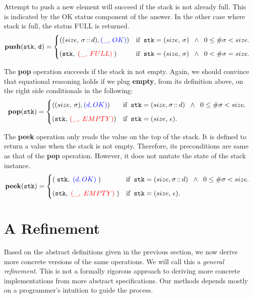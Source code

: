 \documentclass[10pt]{article}
\begin{document}
    Attempt to push a new element will succeed if the stack is not already full. This is indicated by the OK status component of the answer. In the other case where stack is full, the status FULL is returned.
    \[
        \mathtt{\mathbf{push}(stk,\, d)} = \begin{cases} ((size, \,\sigma \,\mathbf{::}\, d),  {\textcolor{blue}{(\_, \,OK)}}) & \mbox{if\;\;} \mathtt{stk} = (size, \,\sigma) \;\; \wedge \;\; 0 \leq \#\sigma < size. \vspace*{6pt}\\ 
        (\mathtt{stk},\;{\textcolor{red}{(\_, \,FULL)}} \; ) & \mbox{if\;\;} \mathtt{stk} = (size, \,\sigma) \;\; \wedge \;\; 0 < \#\sigma = size. \end{cases} 
    \]

    The \textbf{pop} operation succeeds if the stack in not empty. Again, we should convince that equational reasoning holds if we plug \textbf{empty}, from its definition above, on the right side conditionals in the following:
    \[
        \mathtt{\mathbf{pop}(stk)} = \begin{cases} ((size, \, \sigma), {\textcolor{blue}{(d, OK)}}) & \mbox{if\;\;} \mathtt{stk} = (size, \sigma \,\mathbf{::} \,d) \;\; \wedge \;\; 0 
        \leq \#\sigma < size. \vspace*{6pt}\\ 
        (\mathtt{stk},\,{\textcolor{red}{(\_,\; EMPTY)}})  & \mbox{if\;\;}\mathtt{stk} = (size, \, \epsilon). \end{cases} 
    \]

    The \textbf{peek} operation only reads the value on the top of the stack. It is defined to return a value when the stack is not empty. Therefore, its preconditions are same as that of the \textbf{pop} operation. However, it does not mutate the state of the stack instance.
    \[
        \mathtt{\mathbf{peek}(stk)} = \begin{cases} (\; \mathtt{stk}, \; {\textcolor{blue}{(d, OK)}}\;) & \mbox{if\;\;} \mathtt{stk} = (size, \sigma\,\mathbf{::}\,d) \;\; \wedge\; \; 0 \leq \#\sigma < size. \vspace*{6pt}\\ 
        (\mathtt{stk},\; {\textcolor{red}{(\_,\; EMPTY)}}\;)  & \mbox{if\;\;} \mathtt{stk} = (size,\,\epsilon). \end{cases} 
    \]

  \section{A Refinement}
    Based on the abstract definitions given in the previous section, we now derive more concrete versions of the same operations. We will call this a \emph{general refinement}. This is not a formally rigorous approach to deriving more concrete implementations from more abstract specifications. Our methods depends mostly on a programmer's intuition to guide the process.
\end{document}
